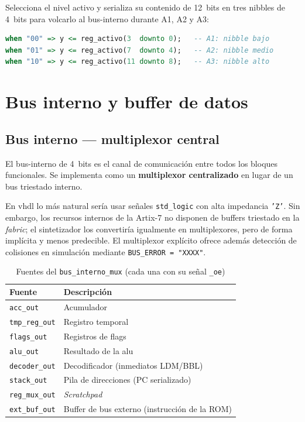 \documentclass[%
    school=etsisi,%
    type=pfg,%
    degree=61CI,%
]{upm-report}
\newcommand{\vhdlfile}[1]{%
    \par\noindent{\small\sffamily\color{gray}Fichero: \texttt{#1}}\par\smallskip
}
\begin{document}
Selecciona el nivel activo y serializa su contenido de 12~bits en tres
\glspl{nibble} de 4~bits para volcarlo al \gls{bus-interno} durante A1, A2
y A3:

\begin{lstlisting}[language=VHDL, caption={Serialización del PC en \texttt{mtx\_stack}},
    label=lst:mtx-stack-ser]
when "00" => y <= reg_activo(3  downto 0);   -- A1: nibble bajo
when "01" => y <= reg_activo(7  downto 4);   -- A2: nibble medio
when "10" => y <= reg_activo(11 downto 8);   -- A3: nibble alto
\end{lstlisting}

\section{Bus interno y buffer de datos}
\label{s:interfaz}

\subsection{Bus interno --- multiplexor central}
\label{ss:bus-interno}
\vhdlfile{bus\_interno\_mux.vhd}

El \gls{bus-interno} de 4~bits es el canal de comunicación entre todos los
bloques funcionales.  Se implementa como un \textbf{multiplexor centralizado}
en lugar de un bus triestado interno.

En \acrshort{vhdl} lo más natural sería usar señales \texttt{std\_logic} con
alta impedancia \texttt{'Z'}.  Sin embargo, los recursos internos de la
Artix-7 no disponen de buffers triestado en la \textit{fabric}; el
sintetizador los convertiría igualmente en multiplexores, pero de forma
implícita y menos predecible.  El multiplexor explícito ofrece además
detección de colisiones en simulación mediante \texttt{BUS\_ERROR = "XXXX"}.

\begin{table}[H]
\centering
\caption{Fuentes del \texttt{bus\_interno\_mux} (cada una con su señal \texttt{\_oe})}
\label{tab:bus-mux}
\begin{tabularx}{\textwidth}{@{}lX@{}}
\toprule
\textbf{Fuente}        & \textbf{Descripción} \\
\midrule
\texttt{acc\_out}      & Acumulador \\
\texttt{tmp\_reg\_out} & Registro temporal \\
\texttt{flags\_out}    & Registros de flags \\
\texttt{alu\_out}      & Resultado de la \acrshort{alu} \\
\texttt{decoder\_out}  & Decodificador (inmediatos LDM/BBL) \\
\texttt{stack\_out}    & Pila de direcciones (PC serializado) \\
\texttt{reg\_mux\_out} & \textit{Scratchpad} \\
\texttt{ext\_buf\_out} & Buffer de bus externo (instrucción de la ROM) \\
\bottomrule
\end{tabularx}
\end{table}
\end{document}
